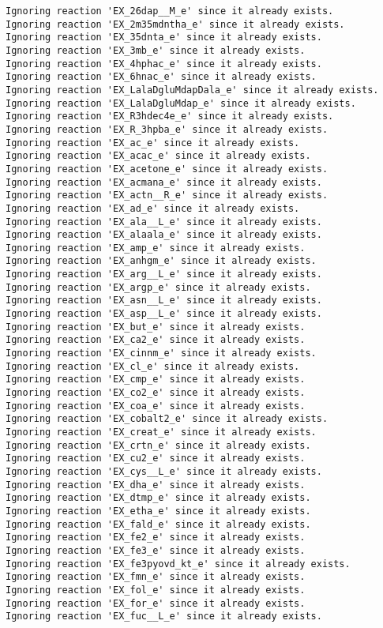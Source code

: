\documentclass[
  letterpaper,
  DIV=11,
  numbers=noendperiod]{scrartcl}
\begin{document}
\begin{verbatim}
Ignoring reaction 'EX_26dap__M_e' since it already exists.
Ignoring reaction 'EX_2m35mdntha_e' since it already exists.
Ignoring reaction 'EX_35dnta_e' since it already exists.
Ignoring reaction 'EX_3mb_e' since it already exists.
Ignoring reaction 'EX_4hphac_e' since it already exists.
Ignoring reaction 'EX_6hnac_e' since it already exists.
Ignoring reaction 'EX_LalaDgluMdapDala_e' since it already exists.
Ignoring reaction 'EX_LalaDgluMdap_e' since it already exists.
Ignoring reaction 'EX_R3hdec4e_e' since it already exists.
Ignoring reaction 'EX_R_3hpba_e' since it already exists.
Ignoring reaction 'EX_ac_e' since it already exists.
Ignoring reaction 'EX_acac_e' since it already exists.
Ignoring reaction 'EX_acetone_e' since it already exists.
Ignoring reaction 'EX_acmana_e' since it already exists.
Ignoring reaction 'EX_actn__R_e' since it already exists.
Ignoring reaction 'EX_ad_e' since it already exists.
Ignoring reaction 'EX_ala__L_e' since it already exists.
Ignoring reaction 'EX_alaala_e' since it already exists.
Ignoring reaction 'EX_amp_e' since it already exists.
Ignoring reaction 'EX_anhgm_e' since it already exists.
Ignoring reaction 'EX_arg__L_e' since it already exists.
Ignoring reaction 'EX_argp_e' since it already exists.
Ignoring reaction 'EX_asn__L_e' since it already exists.
Ignoring reaction 'EX_asp__L_e' since it already exists.
Ignoring reaction 'EX_but_e' since it already exists.
Ignoring reaction 'EX_ca2_e' since it already exists.
Ignoring reaction 'EX_cinnm_e' since it already exists.
Ignoring reaction 'EX_cl_e' since it already exists.
Ignoring reaction 'EX_cmp_e' since it already exists.
Ignoring reaction 'EX_co2_e' since it already exists.
Ignoring reaction 'EX_coa_e' since it already exists.
Ignoring reaction 'EX_cobalt2_e' since it already exists.
Ignoring reaction 'EX_creat_e' since it already exists.
Ignoring reaction 'EX_crtn_e' since it already exists.
Ignoring reaction 'EX_cu2_e' since it already exists.
Ignoring reaction 'EX_cys__L_e' since it already exists.
Ignoring reaction 'EX_dha_e' since it already exists.
Ignoring reaction 'EX_dtmp_e' since it already exists.
Ignoring reaction 'EX_etha_e' since it already exists.
Ignoring reaction 'EX_fald_e' since it already exists.
Ignoring reaction 'EX_fe2_e' since it already exists.
Ignoring reaction 'EX_fe3_e' since it already exists.
Ignoring reaction 'EX_fe3pyovd_kt_e' since it already exists.
Ignoring reaction 'EX_fmn_e' since it already exists.
Ignoring reaction 'EX_fol_e' since it already exists.
Ignoring reaction 'EX_for_e' since it already exists.
Ignoring reaction 'EX_fuc__L_e' since it already exists.

\end{verbatim}
\end{document}

